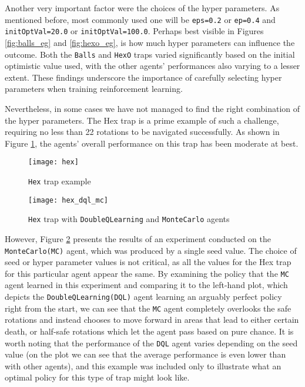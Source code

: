 Another very important factor were the choices of the hyper parameters. As mentioned before, most commonly used one will be \texttt{eps=0.2} or \texttt{ep=0.4} and \texttt{initOptVal=20.0} or \texttt{initOptVal=100.0}. Perhaps best visible in Figures \ref{fig:balls_eg} and \ref{fig:hexo_eg}, is how much hyper parameters can influence the outcome. Both the \texttt{Balls} and \texttt{HexO} traps varied significantly based on the initial optimistic value used, with the other agents' performances also varying to a lesser extent. These findings underscore the importance of carefully selecting hyper parameters when training reinforcement learning.

Nevertheless, in some cases we have not managed to find the right combination of the hyper parameters. The Hex trap is a prime example of such a challenge, requiring no less than 22 rotations to be navigated successfully. As shown in Figure \ref{fig:hex_eg}, the agents' overall performance on this trap has been moderate at best.

\begin{figure}[h]
    \centering
    \texttt{[image: hex]}
    \caption{\texttt{Hex} trap example}
    \label{fig:hex_eg}
\end{figure}

\begin{figure}[h]
    \centering
    \texttt{[image: hex\_dql\_mc]}
    \caption{\texttt{Hex} trap with \texttt{DoubleQLearning} and \texttt{MonteCarlo} agents}
    \label{fig:hex_diff_eg}
\end{figure}

However, Figure \ref{fig:hex_diff_eg} presents the results of an experiment conducted on the \texttt{MonteCarlo(MC)} agent, which was produced by a single seed value. The choice of seed or hyper parameter values is not critical, as all the values for the Hex trap for this particular agent appear the same. By examining the policy that the \texttt{MC} agent learned in this experiment and comparing it to the left-hand plot, which depicts the \texttt{DoubleQLearning(DQL)} agent learning an arguably perfect policy right from the start, we can see that the \texttt{MC} agent completely overlooks the safe rotations and instead chooses to move forward in areas that lead to either certain death, or half-safe rotations which let the agent pass based on pure chance. It is worth noting that the performance of the \texttt{DQL} agent varies depending on the seed value (on the plot we can see that the average performance is even lower than with other agents), and this example was included only to illustrate what an optimal policy for this type of trap might look like.

